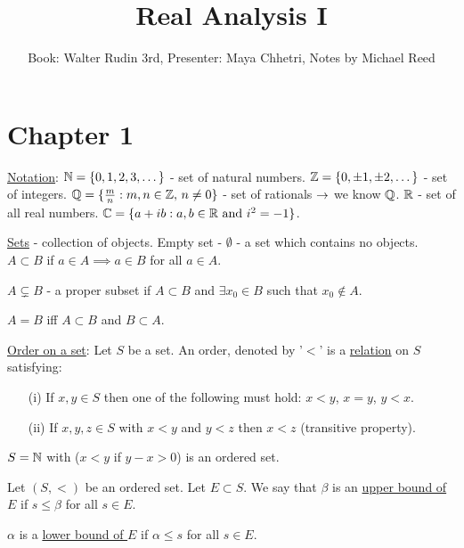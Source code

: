 \documentclass[]{article}
\author{Book: Walter Rudin 3rd, Presenter: Maya Chhetri, Notes by Michael Reed}
\title{Real Analysis I}
\begin{document}
\maketitle


\section{Chapter 1}

\ul{Notation}: $\mathbb{N} = \{0,1,2,3,\dots\}$ - set of natural numbers.
$\mathbb{Z} = \{0,\pm 1, \pm 2,\dots\}$ - set of integers.
$\mathbb{Q} = \{\frac{m}{n}:m,n\in\mathbb{Z},\, n\neq 0\}$ - set of rationals $\rightarrow$ we know $\mathbb{Q}$.
$\mathbb{R}$ - set of all real numbers.
$\mathbb{C} = \{a+ib: a,b\in\mathbb{R} \text{ and } i^2 = -1\}$.

\ul{Sets} - collection of objects. Empty set - $\emptyset$ - a set which contains no objects.
$A\subset B$ if $a\in A \implies a\in B$ for all $a\in A$.
\begin{example}
	$A\varsubsetneq B$ - a proper subset if $A\subset B$ and $\exists x_0 \in B$ such that $x_0 \notin A$.
\end{example}
\begin{note}
	$A = B$ iff $A\subset B$ and $B\subset A$.
\end{note}

\ul{Order on a set}: Let $S$ be a set. An order, denoted by '$<$' is a \ul{relation} on $S$ satisfying:
\begin{enumerate}
	\item[(i)] If $x,y\in S$ then one of the following must hold:
	$x<y$, $x = y$, $y<x$.
	\item[(ii)] If $x,y,z\in S$ with $x<y$ and $y<z$ then $x<z$ (transitive property).
\end{enumerate}
\begin{example}
	$S = \mathbb{N}$ with \say{$<$} ($x<y$ if $y-x>0$) is an ordered set.
\end{example}
\begin{definition}
	 Let $(S,<)$ be an ordered set. Let $E\subset S$. We say that $\beta$ is an \ul{upper bound of $E$} if $s\leq\beta$ for all $s\in E$.
\end{definition}
\begin{definition}
	 $\alpha$ is a \ul{lower bound of $E$} if $\alpha \leq s$ for all $s\in E$.
\end{definition}
\end{document}
